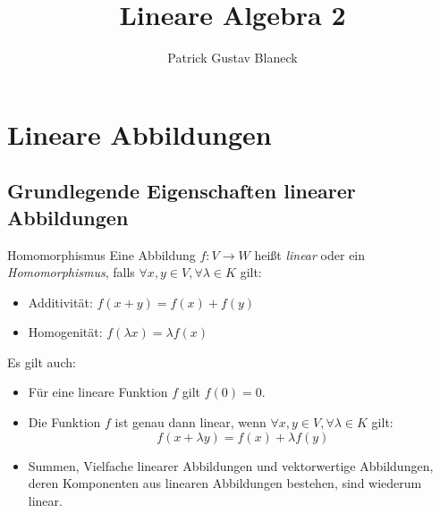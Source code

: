 \documentclass[german]{../spicker}
\title{Lineare Algebra 2}
\author{Patrick Gustav Blaneck}
\begin{document}
\maketitle
\tableofcontents
\newpage


\section{Lineare Abbildungen}

\subsection{Grundlegende Eigenschaften linearer Abbildungen}

\begin{defi}{Homomorphismus}
    Eine Abbildung $f : V \to W$ heißt \emph{linear} oder ein \emph{Homomorphismus}, falls $\forall x, y \in V, \forall \lambda \in K$ gilt:
    \begin{itemize}
        \item Additivität: $f(x + y) = f(x) + f(y)$
        \item Homogenität: $f(\lambda x) = \lambda f(x)$
    \end{itemize}

    Es gilt auch:
    \begin{itemize}
        \item Für eine lineare Funktion $f$ gilt $f(0) = 0$.
        \item Die Funktion $f$ ist genau dann linear, wenn $\forall x, y \in V, \forall \lambda \in K$ gilt:
              $$
                  f(x + \lambda y) = f(x) + \lambda f(y)
              $$
        \item Summen, Vielfache linearer Abbildungen und vektorwertige Abbildungen, deren Komponenten aus linearen Abbildungen bestehen, sind wiederum linear.
    \end{itemize}
\end{defi}
\end{document}
